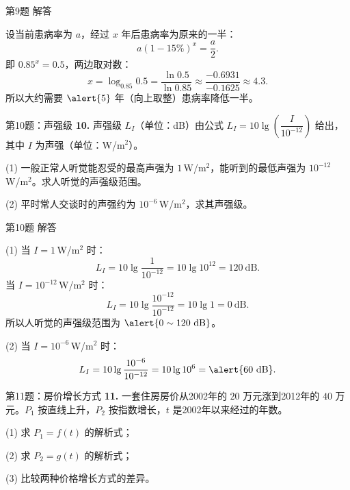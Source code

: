 \documentclass[10pt,aspectratio=169,serif]{beamer}
\begin{document}
\begin{frame}[t]{第9题 解答}
\begin{tcolorbox}[colback=orange!10,colframe=orange,title=\textbf{解}]
设当前患病率为 $a$，经过 $x$ 年后患病率为原来的一半：
\[
a(1-15\%)^x = \frac{a}{2}.
\]
即 $0.85^x = 0.5$，两边取对数：
\[
x = \log_{0.85} 0.5 = \frac{\ln 0.5}{\ln 0.85} \approx \frac{-0.6931}{-0.1625} \approx 4.3.
\]
所以大约需要 $\alert{5}$ 年（向上取整）患病率降低一半。
\end{tcolorbox}
\end{frame}

\begin{frame}[t]{第10题：声强级}
\textbf{10.} 声强级 $L_I$（单位：dB）由公式 $L_I = 10\lg\!\left(\dfrac{I}{10^{-12}}\right)$ 给出，其中 $I$ 为声强（单位：W/m$^2$）。

\vspace{0.5em}
(1) 一般正常人听觉能忍受的最高声强为 $1$\,W/m$^2$，能听到的最低声强为 $10^{-12}$\,W/m$^2$。求人听觉的声强级范围。

(2) 平时常人交谈时的声强约为 $10^{-6}$\,W/m$^2$，求其声强级。
\end{frame}

\begin{frame}[t]{第10题 解答}
\begin{tcolorbox}[colback=orange!10,colframe=orange,title=\textbf{解}]
(1) 当 $I=1$\,W/m$^2$ 时：
\[
L_I = 10\lg\frac{1}{10^{-12}} = 10\lg 10^{12} = 120\ \text{dB}.
\]
当 $I=10^{-12}$\,W/m$^2$ 时：
\[
L_I = 10\lg\frac{10^{-12}}{10^{-12}} = 10\lg 1 = 0\ \text{dB}.
\]
所以人听觉的声强级范围为 $\alert{0\sim 120\ \text{dB}}$。

(2) 当 $I=10^{-6}$\,W/m$^2$ 时：
\[
L_I = 10\lg\frac{10^{-6}}{10^{-12}} = 10\lg 10^6 = \alert{60\ \text{dB}}.
\]
\end{tcolorbox}
\end{frame}

\begin{frame}[t]{第11题：房价增长方式}
\textbf{11.} 一套住房房价从2002年的 $20$ 万元涨到2012年的 $40$ 万元。$P_1$ 按直线上升，$P_2$ 按指数增长，$t$ 是2002年以来经过的年数。

\vspace{0.3em}
(1) 求 $P_1=f(t)$ 的解析式；

(2) 求 $P_2=g(t)$ 的解析式；

(3) 比较两种价格增长方式的差异。
\end{frame}
\end{document}

